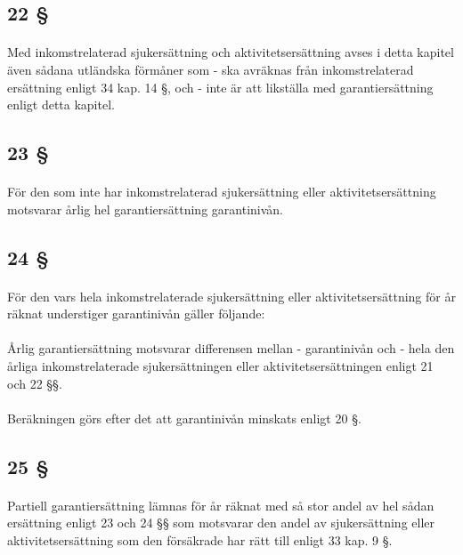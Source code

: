 \documentclass[a4paper,notitlepage,openany,10pt]{book}
\begin{document}
\subsection*{22 §}
\paragraph*{}
Med inkomstrelaterad sjukersättning och aktivitetsersättning avses i detta kapitel även sådana utländska förmåner som
\newline - ska avräknas från inkomstrelaterad ersättning enligt 34 kap. 14 §, och
\newline - inte är att likställa med garantiersättning enligt detta kapitel.
\subsection*{23 §}
\paragraph*{}
För den som inte har inkomstrelaterad sjukersättning eller aktivitetsersättning motsvarar årlig hel garantiersättning garantinivån.
\subsection*{24 §}
\paragraph*{}
För den vars hela inkomstrelaterade sjukersättning eller aktivitetsersättning för år räknat understiger garantinivån gäller följande:
\paragraph*{}
Årlig garantiersättning motsvarar differensen mellan
\newline - garantinivån och
\newline - hela den årliga inkomstrelaterade sjukersättningen eller aktivitetsersättningen enligt 21 och 22 §§.
\paragraph*{}
Beräkningen görs efter det att garantinivån minskats enligt 20 §.
\subsection*{25 §}
\paragraph*{}
Partiell garantiersättning lämnas för år räknat med så stor andel av hel sådan ersättning enligt 23 och 24 §§ som motsvarar den andel av sjukersättning eller aktivitetsersättning som den försäkrade har rätt till enligt 33 kap. 9 §.
\end{document}
